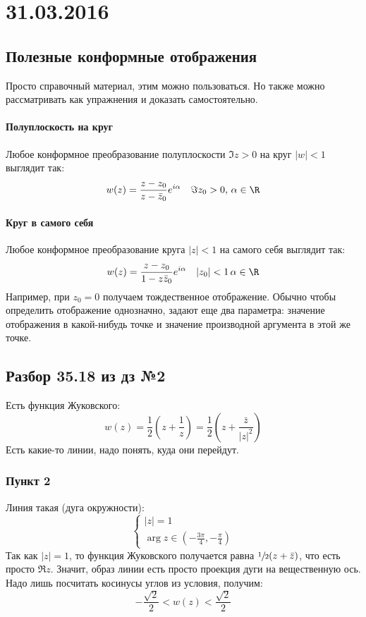 \chapter{31.03.2016}

\section{Полезные конформные отображения}
	Просто справочный материал, этим можно пользоваться.
	Но также можно рассматривать как упражнения и доказать самостоятельно.

	\subsubsection{Полуплоскость на круг}
		Любое конформное преобразование полуплоскости $\Im z > 0$ на круг $|w|<1$ выглядит так:
		\[
			w(z) = \frac{z-z_0}{z-\bar z_0} e^{i\alpha} \quad \Im z_0 > 0,\, \alpha \in \R
		\]

	\subsubsection{Круг в самого себя}\label{day160331_circle_auto}
		Любое конформное преобразование круга $|z|<1$ на самого себя выглядит так:
		\[
			w(z) = \frac{z-z_0}{1-z\bar z_0} e^{i\alpha} \quad |z_0| < 1\, \alpha \in \R
		\]
		Например, при $z_0=0$ получаем тождественное отображение.
		Обычно чтобы определить отображение однозначно, задают еще два параметра:
		значение отображения в какой-нибудь точке и значение производной аргумента в этой же точке.

\section{Разбор 35.18 из дз №2}
	Есть функция Жуковского:
	\[ w(z) = \frac12\left(z+\frac1z\right) = \frac12\left(z+\frac{\bar z}{|z|^2}\right) \]
	Есть какие-то линии, надо понять, куда они перейдут.
	\subsection{Пункт 2}
		Линия такая (дуга окружности):
		\[
			\begin{cases}
				|z|=1 \\
				\arg z \in \left(-\frac{3\pi}{4}, -\frac{\pi}{4}\right)
			\end{cases}
		\]
		Так как $|z|=1$, то функция Жуковского получается равна $\sfrac 12(z+\bar z)$,
		что есть просто $\Re z$.
		Значит, образ линии есть просто проекция дуги на вещественную ось.
		Надо лишь посчитать косинусы углов из условия, получим:
		\[ -\frac{\sqrt2}{2} < w(z) < \frac{\sqrt 2}{2} \]

